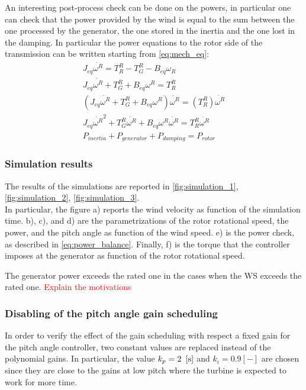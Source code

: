 An interesting post-process check can be done on the powers, in particular one can check that the power provided by the wind is equal to the sum between the one processed by the generator, the one stored in the inertia and the one lost in the damping. In particular the power equations to the rotor side of the transmission can be written starting from \ref{eq:mech_eq}:
\begin{gather}
    J_{eq}\dot{\omega^{R}} = T_R^R - T_G^R-B_{eq}\omega_R\\
    J_{eq}\dot{\omega^{R}} + T_G^R + B_{eq}\omega^R = T_R^R\\
    \left(J_{eq}\dot{\omega^{R}} + T_G^R + B_{eq}\omega^R\right)\dot{\omega^R} = \left(T_R^R\right)\dot{\omega^R}\\
    J_{eq}\dot{\omega^{R}}^2 + T_G^R\dot{\omega^R} + B_{eq}\omega^R\dot{\omega^R} = T_R^R\dot{\omega^R}\\
    P_{inertia} + P_{generator} + P_{damping} = P_{rotor} 
    \label{eq:power_balance}
\end{gather}

\subsubsection{Simulation results}
The results of the simulations are reported in \autoref{fig:simulation_1}, \ref{fig:simulation_2}, \ref{fig:simulation_3}. \\
In particular, the figure a) reports the wind velocity as function of the simulation time. b), c), and d) are the parametrizations of the rotor rotational speed, the power, and the pitch angle as function of the wind speed. e) is the power check, as described in \autoref{eq:power_balance}. Finally, f) is the torque that the controller imposes at the generator as function of the rotor rotational speed. 


The generator power exceeds the rated one in the cases when the \acrshort{WS} exceeds the rated one. \textcolor{red}{Explain the motivations}\\


\subsubsection[]{Disabling of the pitch angle gain scheduling}
In order to verify the effect of the gain scheduling with respect a fixed gain for the pitch angle controller, two constant values are replaced instead of the polynomial gains. In particular, the value $k_p=2 \ \left[\si{\second}\right]$ and $k_i=0.9 \left[-\right]$ are chosen since they are close to the gains at low pitch where the turbine is expected to work for more time.  

